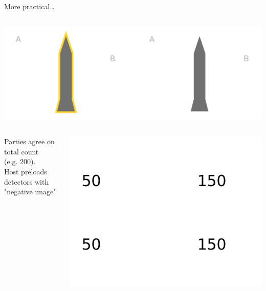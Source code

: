 \documentclass[presentation]{beamer}
\begin{document}
\begin{frame}[label=sec-5-5]{More practical\ldots{}}
\begin{columns}
\begin{column}{0.48\textwidth}

\includegraphics[width=\textwidth]{images/zkp/measurement_step1.pdf}
\vspace{1cm}

\pause

\begin{columns}
\begin{column}{0.48\textwidth}

\fontsize{8pt}{9.6}\selectfont

Parties agree on total count \\ (e.g. 200). \\ Host preloads detectors with "negative image". 

\normalsize
\end{column}

\begin{column}{0.48\textwidth}

\includegraphics[width=\textwidth]{images/zkp/measurement_detectors_host.pdf}


\end{column}
\end{columns}
\end{column}
\end{columns}
\end{frame}
\end{document}
